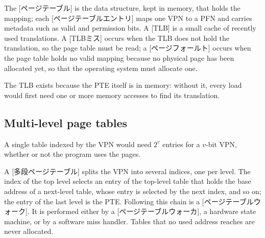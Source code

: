\documentclass[../main.tex]{subfiles}
\begin{document}
\begin{definition}
  \label{def:l07-tlb}
  The [ページテーブル] is the data structure, kept in
  memory, that holds the mapping; each
  [ページテーブルエントリ] maps one VPN to
  a PFN and carries metadata such as valid and permission bits.  A
  [TLB] is a small cache of
  recently used translations.  A [TLBミス] occurs when
  the TLB does not hold the translation, so the page table must be read;
  a [ページフォールト] occurs when the page table holds
  no valid mapping because no physical page has been allocated yet, so
  that the operating system must allocate one.
\end{definition}

%
The TLB exists because the PTE itself is in memory: without it, every
load would first need one or more memory accesses to find its
translation.

\subsection{Multi-level page tables}

A single table indexed by the VPN would need $2^{v}$ entries for a
$v$-bit VPN, whether or not the program uses the pages.

\begin{definition}
  \label{def:l07-multilevel}
  A [多段ページテーブル] splits the VPN
  into several indices, one per level.  The index of the top level
  selects an entry of the top-level table that holds the base address
  of a next-level table, whose entry is selected by the next index, and
  so on; the entry of the last level is the PTE.  Following this chain
  is a [ページテーブルウォーク].  It is performed
  either by a [ページテーブルウォーカ], a
  hardware state machine, or by a software miss handler.  Tables that
  no used address reaches are never allocated.
\end{definition}
\end{document}
